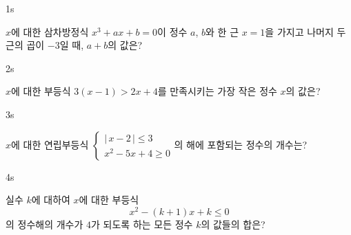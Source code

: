 \documentclass[10pt]{article}
\begin{document}


\begin{pagepair}

\begin{problem}{1}{s}
\par\smallskip
$x$에 대한 삼차방정식 $x^3 + ax + b = 0$이 정수 $a$, $b$와 한 근 $x = 1$을 가지고 나머지 두 근의 곱이 $-3$일 때, $a + b$의 값은?
\begin{choices}
\end{choices}
\end{problem}

\begin{problem}{2}{s}
\par\smallskip
$x$에 대한 부등식 $3(x - 1) > 2x + 4$를 만족시키는 가장 작은 정수 $x$의 값은?
\begin{choices}
\end{choices}
\end{problem}

\end{pagepair}

\begin{pagepair}

\begin{problem}{3}{s}
\par\smallskip
$x$에 대한 연립부등식 $\begin{cases} |\,x - 2\,| \le 3 \\ x^2 - 5x + 4 \ge 0 \end{cases}$의 해에 포함되는 정수의 개수는?
\begin{choices}
\end{choices}
\end{problem}

\begin{problem}{4}{s}
\par\smallskip
실수 $k$에 대하여 $x$에 대한 부등식
$$x^2 - (k + 1)x + k \le 0$$
의 정수해의 개수가 $4$가 되도록 하는 모든 정수 $k$의 값들의 합은?
\begin{choices}
\end{choices}
\end{problem}

\end{pagepair}
\end{document}
